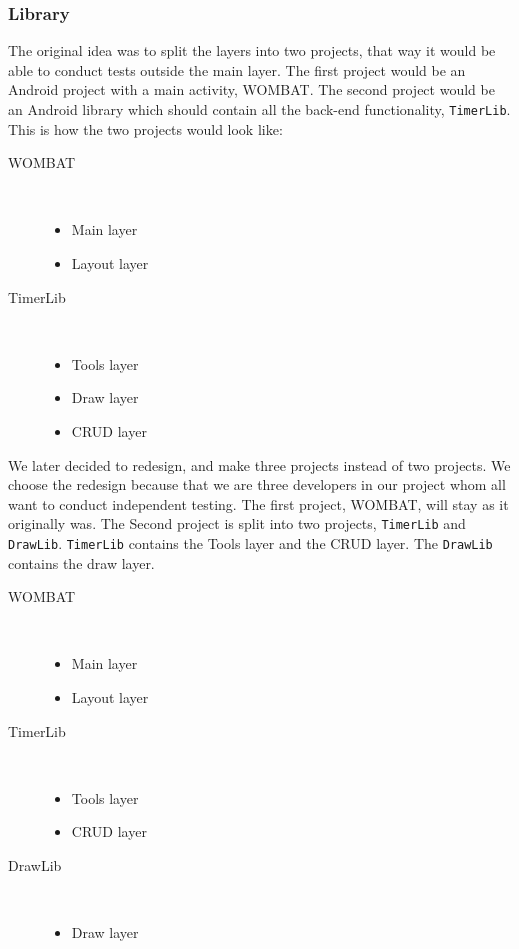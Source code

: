 \subsubsection{Library}

The original idea was to split the layers into two projects, that way it would be able to conduct tests outside the main layer. The first project would be an Android project with a main activity, WOMBAT. The second project would be an Android library which should contain all the back-end functionality, \texttt{TimerLib}. This is how the two projects would look like:

\begin{description}
  \item[WOMBAT] \hfill \\\begin{itemize}  \item Main layer  \item Layout layer
\end{itemize}
  \item[TimerLib] \hfill \\\begin{itemize}  \item Tools layer  \item Draw layer  \item CRUD layer
\end{itemize}
\end{description}

We later decided to redesign, and make three projects instead of two projects. We choose the redesign because that we are three developers in our project whom all want to conduct independent testing. The first project, WOMBAT, will stay as it originally was. The Second project is split into two projects, \texttt{TimerLib} and \texttt{DrawLib}. \texttt{TimerLib} contains the Tools layer and the CRUD layer. The \texttt{DrawLib} contains the draw layer.

\begin{description}
  \item[WOMBAT] \hfill \\\begin{itemize}  \item Main layer  \item Layout layer\end{itemize}
  \item[TimerLib] \hfill \\\begin{itemize}  \item Tools layer  \item CRUD layer
\end{itemize}
  \item[DrawLib] \hfill \\\begin{itemize}  \item Draw layer\end{itemize}
\end{description}

